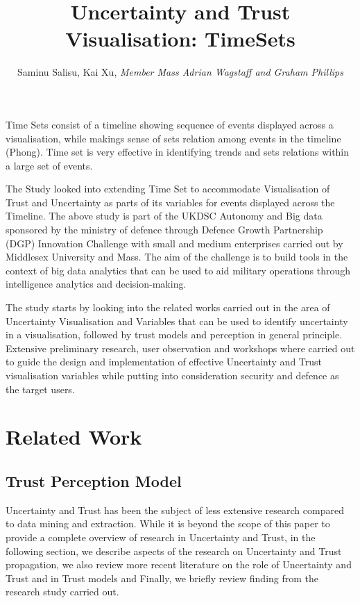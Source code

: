 \documentclass[journal]{vgtc}                %
\title{Uncertainty and Trust Visualisation: TimeSets}
\author{Saminu Salisu, Kai Xu, \textit{Member Mass Adrian Wagstaff and Graham Phillips}}
\begin{document}

\maketitle
Time Sets consist of a timeline showing sequence of events displayed across a visualisation, while makings sense of sets relation among events in the timeline (Phong). Time set is very effective in identifying trends and sets relations within a large set of events. 

The Study looked into extending Time Set to accommodate Visualisation of Trust and Uncertainty as parts of its variables for events displayed across the Timeline. The above study is part of the UKDSC Autonomy and Big data sponsored by the ministry of defence through Defence Growth Partnership (DGP) Innovation Challenge with small and medium enterprises carried out by Middlesex University and Mass. The aim of the challenge is to build tools in the context of big data analytics that can be used to aid military operations through intelligence analytics and decision-making. 

The study starts by looking into the related works carried out in the area of Uncertainty Visualisation and Variables that can be used to identify uncertainty in a visualisation, followed by trust models and perception in general principle. Extensive preliminary research, user observation and workshops where carried out to guide the design and implementation of effective Uncertainty and Trust visualisation variables while putting into consideration security and defence as the target users.

\section{Related Work}

\subsection{Trust Perception Model}

Uncertainty and Trust has been the subject of less extensive research compared to data mining and extraction. While it is beyond the scope of this paper to provide a complete overview of research in Uncertainty and Trust, in the following section, we describe aspects of the research on Uncertainty and Trust propagation, we also review more recent literature on the role of Uncertainty and Trust and in Trust models and Finally, we briefly review finding from the research study carried out.
\end{document}
